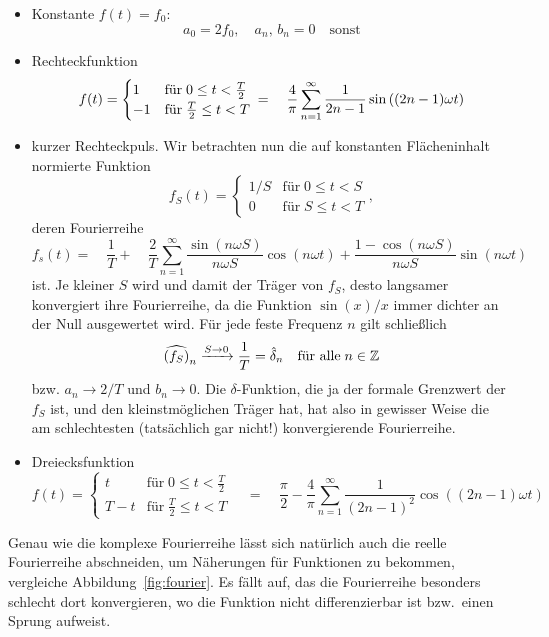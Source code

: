 \begin{itemize}
\item Konstante $f(t) = f_0$:
  \begin{equation}
    a_0 = 2 f_0,\quad a_n,\,b_n= 0\quad\text{sonst}
  \end{equation}
\item Rechteckfunktion
  \begin{equation}
    f(t) = \begin{cases}
      1 &\text{für}\; 0 \le t < \frac{T}{2} \\
      -1  &\text{für}\; \frac{T}{2} \le t < T
    \end{cases}\\
    = \quad\frac{4}{\pi}\sum_{n=1}^\infty
    \frac{1}{2n-1}\sin\left((2n-1)\omega t\right)
  \end{equation}
\item kurzer Rechteckpuls. Wir betrachten nun die auf konstanten
  Flächeninhalt normierte Funktion
  \begin{equation}
    f_S(t) = \begin{cases}
      1/S &\text{für}\; 0 \le t < S \\
      0  &\text{für}\; S \le t < T
    \end{cases},
  \end{equation}
  deren Fourierreihe
  \begin{equation}
    f_s(t) =
    \quad \frac{1}{T} +
    \quad\frac{2}{T}\sum_{n=1}^\infty
    \frac{\sin(n\omega S)}{n\omega S}\cos(n\omega t) +
    \frac{1-\cos(n\omega S)}{n\omega S}\sin(n\omega t)
  \end{equation}
  ist. Je kleiner $S$ wird und damit der Träger von $f_S$, desto
  langsamer konvergiert ihre Fourierreihe, da die Funktion $\sin(x)/x$
  immer dichter an der Null ausgewertet wird. Für jede feste Frequenz
  $n$ gilt schließlich
  \begin{equation}
    \widehat{\left(f_S\right)}_n \xrightarrow{S\to 0} \frac{1}{T} = \hat\delta_n
    \quad\text{für alle}\;n\in\mathbb{Z}
  \end{equation}
  bzw. $a_n\to 2/T$ und $b_n\to 0$. Die $\delta$-Funktion, die ja der
  formale Grenzwert der $f_S$ ist, und den kleinstmöglichen
  Träger hat, hat also in gewisser Weise die am schlechtesten
  (tatsächlich gar nicht!) konvergierende Fourierreihe.
\item Dreiecksfunktion
  \begin{equation}
    f(t) = \begin{cases}
      t      &\text{für}\; 0 \le t < \frac{T}{2} \\
      T - t  &\text{für}\; \frac{T}{2} \le t < T
    \end{cases}\quad=\quad\frac{\pi}{2} -
    \frac{4}{\pi}\sum_{n=1}^\infty
    \frac{1}{(2n-1)^2}\cos\left((2n-1)\omega t\right)
  \end{equation}
\end{itemize}
Genau wie die komplexe Fourierreihe lässt sich natürlich auch die
reelle Fourierreihe abschneiden, um Näherungen für Funktionen zu
bekommen, vergleiche Abbildung~\ref{fig:fourier}. Es fällt auf, das
die Fourierreihe besonders schlecht dort konvergieren, wo die Funktion
nicht differenzierbar ist bzw.\ einen Sprung aufweist.

